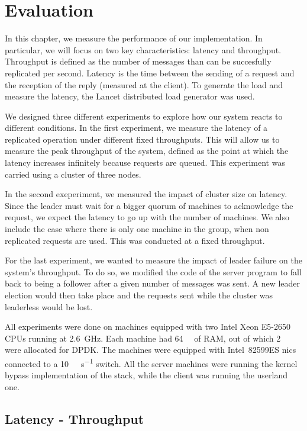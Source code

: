 \chapter{Evaluation}
\label{chap:evaluation}

In this chapter, we measure the performance of our implementation.
In particular, we will focus on two key characteristics: latency and throughput.
Throughput is defined as the number of messages than can be succesfully replicated per second.
Latency is the time between the sending of a request and the reception of the reply (measured at the client).
To generate the load and measure the latency, the Lancet distributed load generator\cite{lancet} was used.

We designed three different experiments to explore how our system reacts to different conditions.
In the first experiment, we measure the latency of a replicated operation under different fixed throughputs.
This will allow us to measure the peak throughput of the system, defined as the point at which the latency increases infinitely because requests are queued.
This experiment was carried using a cluster of three nodes.

In the second exeperiment, we measured the impact of cluster size on latency.
Since the leader must wait for a bigger quorum of machines to acknowledge the request, we expect the latency to go up with the number of machines.
We also include the case where there is only one machine in the group, \ie when non replicated requests are used.
This was conducted at a fixed throughput.

For the last experiment, we wanted to measure the impact of leader failure on the system's throughput.
To do so, we modified the code of the server program to fall back to being a follower after a given number of messages was sent.
A new leader election would then take place and the requests sent while the cluster was leaderless would be lost.

All experiments were done on machines equipped with two Intel Xeon E5-2650 CPUs running at \SI{2.6}{\giga\hertz}.
Each machine had \SI{64}{\giga\byte} of RAM, out of which \SI{2}{\giga\byte} were allocated for DPDK.
The machines were equipped with Intel~82599ES \glspl{nic} connected to a \SI{10}{\giga\bit\per\second} switch.
All the server machines were running the kernel bypass implementation of the stack, while the client was running the userland one.

\section{Latency - Throughput}
\label{sec:latency_throughput}

